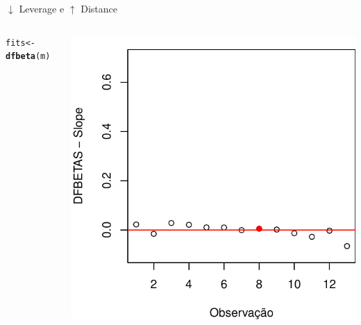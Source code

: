 \documentclass{beamer}\usepackage[]{graphicx}\usepackage[]{color}
\makeatletter
\newcommand{\hlstd}[1]{\textcolor[rgb]{0.345,0.345,0.345}{#1}}%
\newcommand{\hlkwb}[1]{\textcolor[rgb]{0.69,0.353,0.396}{#1}}%
\newcommand{\hlkwd}[1]{\textcolor[rgb]{0.737,0.353,0.396}{\textbf{#1}}}%
\newenvironment{kframe}{%
 \def\at@end@of@kframe{}%
 \ifinner\ifhmode%
  \def\at@end@of@kframe{\end{minipage}}%
  \begin{minipage}{\columnwidth}%
 \fi\fi%
 \def\FrameCommand##1{\hskip\@totalleftmargin \hskip-\fboxsep
 \colorbox{shadecolor}{##1}\hskip-\fboxsep
     \hskip-\linewidth \hskip-\@totalleftmargin \hskip\columnwidth}%
 \MakeFramed {\advance\hsize-\width
   \@totalleftmargin\z@ \linewidth\hsize
   \@setminipage}}%
 {\par\unskip\endMakeFramed%
 \at@end@of@kframe}
\newenvironment{knitrout}{}{} %
\renewenvironment{knitrout}{\setlength{\topsep}{0mm}}{}
\makeatother
\begin{document}
\begin{frame}{$\downarrow$ Leverage e $\uparrow$ Distance}
\begin{columns}[c]
\begin{knitrout}\tiny
{}\color{fgcolor}\begin{kframe}
\begin{alltt}
\hlstd{fits} \hlkwb{<-} \hlkwd{dfbeta}\hlstd{(m)}
\end{alltt}
\end{kframe}
\includegraphics[width=1\linewidth]{figure/inf24-1} 

\end{knitrout}

\end{columns}
\end{frame}
\end{document}
